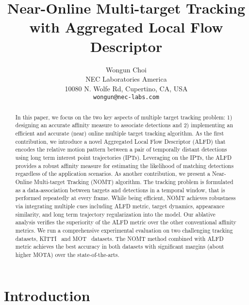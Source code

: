 \documentclass[10pt,twocolumn,letterpaper]{article}
\begin{document}
\title{Near-Online Multi-target Tracking with Aggregated Local Flow Descriptor}

\author{Wongun Choi\\
NEC Laboratories America\\
10080 N. Wolfe Rd, Cupertino, CA, USA\\
{\tt\small wongun@nec-labs.com}
}

\maketitle


\begin{abstract}
In this paper, we focus on the two key aspects of multiple target tracking problem: 1) designing an accurate affinity measure to associate detections and 2) implementing an efficient and accurate (near) online multiple target tracking algorithm. As the first contribution, we introduce a novel Aggregated Local Flow Descriptor (ALFD) that encodes the relative motion pattern between a pair of temporally distant detections using long term interest point trajectories (IPTs). Leveraging on the IPTs, the ALFD provides a robust affinity measure for estimating the likelihood of matching detections regardless of the application scenarios. As another contribution, we present a Near-Online Multi-target Tracking (NOMT) algorithm. The tracking problem is formulated as a data-association between targets and detections in a temporal window, that is performed repeatedly at every frame. While being efficient, NOMT achieves robustness via integrating multiple cues including ALFD metric, target dynamics, appearance similarity, and long term trajectory regularization into the model. Our ablative analysis verifies the superiority of the ALFD metric over the other conventional affinity metrics. We run a comprehensive experimental evaluation on two challenging tracking datasets, KITTI~\cite{Geiger2012CVPR} and MOT~\cite{MOTChallenge} datasets. The NOMT method combined with ALFD metric achieves the best accuracy in both datasets with significant margins (about  higher MOTA) over the state-of-the-arts.
\end{abstract}

\section{Introduction}
 
\end{document}
